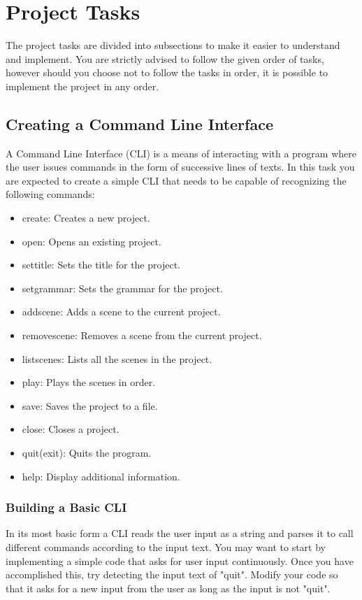 \documentclass[a4paper]{article}
\begin{document}
	\section{Project Tasks}
	\label{tasks}
	The project tasks are divided into subsections to make it easier to understand and implement. You are strictly advised to follow the given order of tasks, however should you choose not to follow the tasks in order, it is possible to implement the project in any order.
	
	\subsection{Creating a Command Line Interface}
	A Command Line Interface (CLI) is a means of interacting with a program where the user issues commands in the form of successive lines of texts. In this task you are expected to create a simple CLI that needs to be capable of recognizing the following commands:
	\label{commands}
	\begin{itemize}
		\item create: Creates a new project.
		\item open: Opens an existing project.
		\item settitle: Sets the title for the project.
		\item setgrammar: Sets the grammar for the project.
		\item addscene: Adds a scene to the current project.
		\item removescene: Removes a scene from the current project.
		\item listscenes: Lists all the scenes in the project.
		\item play: Plays the scenes in order.
		\item save: Saves the project to a file.
		\item close: Closes a project.
		\item quit(exit): Quits the program.
		\item help: Display additional information.
	\end{itemize}
	
	\subsubsection{Building a Basic CLI}
	
	In its most basic form a CLI reads the user input as a string and parses it to call different commands according to the input text. You may want to start by implementing a simple code that asks for user input continuously. Once you have accomplished this, try detecting the input text of "quit". Modify your code so that it asks for a new input from the user as long as the input is not "quit". \\
\end{document}
